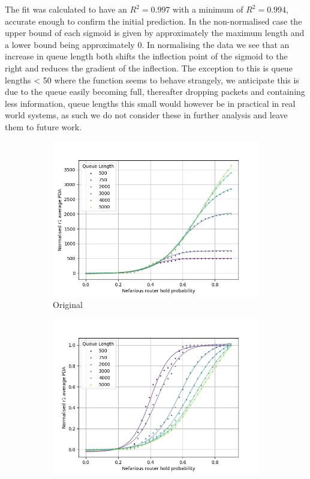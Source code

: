 The fit was calculated to have an $R^2=0.997$ with a minimum of $R^2=0.994$, accurate enough to confirm the initial prediction. In the non-normalised case the upper bound of each sigmoid is given by approximately the maximum length and a lower bound being approximately 0. In normalising the data we see that an increase in queue length both shifts the inflection point of the sigmoid to the right and reduces the gradient of the inflection. The exception to this is queue lengths < 50 where the function seems to behave strangely, we anticipate this is due to the queue easily becoming full, thereafter dropping packets and containing less information, queue lengths this small would however be in practical in real world systems, as such we do not consider these in further analysis and leave them to future work.\par
\begin{figure}[H]
    \centering
    \begin{subfigure}{0.475\textwidth}
        \includegraphics[width=\textwidth]{figs/results/qlen_fitting/qlen_PDA_lm.png}
        \caption{Original}
    \end{subfigure}
    \begin{subfigure}{0.475\textwidth}
        \includegraphics[width=\textwidth]{figs/results/qlen_fitting/norm_qlen_PDA_lm.png}

\end{subfigure}
\end{figure}
